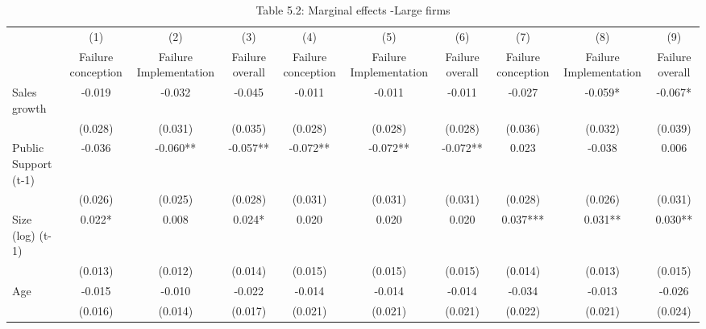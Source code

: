 \begin{table}[htbp]\centering
\def\sym#1{\ifmmode^{#1}\else\(^{#1}\)\fi}
\caption{{Table 5.2: Marginal effects -Large firms}}
\begin{tabular}{l*{9}{c}}
\hline\hline
                    &\multicolumn{1}{c}{(1)}&\multicolumn{1}{c}{(2)}&\multicolumn{1}{c}{(3)}&\multicolumn{1}{c}{(4)}&\multicolumn{1}{c}{(5)}&\multicolumn{1}{c}{(6)}&\multicolumn{1}{c}{(7)}&\multicolumn{1}{c}{(8)}&\multicolumn{1}{c}{(9)}\\
                    &\multicolumn{1}{c}{Failure conception}&\multicolumn{1}{c}{Failure Implementation}&\multicolumn{1}{c}{Failure overall}&\multicolumn{1}{c}{Failure conception}&\multicolumn{1}{c}{Failure Implementation}&\multicolumn{1}{c}{Failure overall}&\multicolumn{1}{c}{Failure conception}&\multicolumn{1}{c}{Failure Implementation}&\multicolumn{1}{c}{Failure overall}\\
\hline
Sales growth        &      -0.019   &      -0.032   &      -0.045   &      -0.011   &      -0.011   &      -0.011   &      -0.027   &      -0.059*  &      -0.067*  \\
                    &     (0.028)   &     (0.031)   &     (0.035)   &     (0.028)   &     (0.028)   &     (0.028)   &     (0.036)   &     (0.032)   &     (0.039)   \\
Public Support (t-1)&      -0.036   &      -0.060** &      -0.057** &      -0.072** &      -0.072** &      -0.072** &       0.023   &      -0.038   &       0.006   \\
                    &     (0.026)   &     (0.025)   &     (0.028)   &     (0.031)   &     (0.031)   &     (0.031)   &     (0.028)   &     (0.026)   &     (0.031)   \\
Size (log) (t-1)    &       0.022*  &       0.008   &       0.024*  &       0.020   &       0.020   &       0.020   &       0.037***&       0.031** &       0.030** \\
                    &     (0.013)   &     (0.012)   &     (0.014)   &     (0.015)   &     (0.015)   &     (0.015)   &     (0.014)   &     (0.013)   &     (0.015)   \\
Age                 &      -0.015   &      -0.010   &      -0.022   &      -0.014   &      -0.014   &      -0.014   &      -0.034   &      -0.013   &      -0.026   \\
                    &     (0.016)   &     (0.014)   &     (0.017)   &     (0.021)   &     (0.021)   &     (0.021)   &     (0.022)   &     (0.021)   &     (0.024)   \\

\end{tabular}
\end{table}
